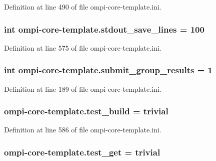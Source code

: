 Definition at line 490 of file ompi-\/core-\/template.\-ini.

\hypertarget{namespaceompi-core-template_a447e1523988469a8bff3078b579fdbbf}{
\subsubsection[{stdout\-\_\-save\-\_\-lines}]{\setlength{\rightskip}{0pt plus 5cm}int ompi-\/core-\/template.\-stdout\-\_\-save\-\_\-lines = 100}}\label{namespaceompi-core-template_a447e1523988469a8bff3078b579fdbbf}


Definition at line 575 of file ompi-\/core-\/template.\-ini.

\hypertarget{namespaceompi-core-template_ad901c84f6aa10668dc9e69ba586dfbf4}{
\subsubsection[{submit\-\_\-group\-\_\-results}]{\setlength{\rightskip}{0pt plus 5cm}int ompi-\/core-\/template.\-submit\-\_\-group\-\_\-results = 1}}\label{namespaceompi-core-template_ad901c84f6aa10668dc9e69ba586dfbf4}


Definition at line 189 of file ompi-\/core-\/template.\-ini.

\hypertarget{namespaceompi-core-template_a0cff68d81d871e9b4b78961025027345}{
\subsubsection[{test\-\_\-build}]{\setlength{\rightskip}{0pt plus 5cm}ompi-\/core-\/template.\-test\-\_\-build = trivial}}\label{namespaceompi-core-template_a0cff68d81d871e9b4b78961025027345}


Definition at line 586 of file ompi-\/core-\/template.\-ini.

\hypertarget{namespaceompi-core-template_a075a5d52fcb2adb80f97aecc076193cd}{
\subsubsection[{test\-\_\-get}]{\setlength{\rightskip}{0pt plus 5cm}ompi-\/core-\/template.\-test\-\_\-get = trivial}}\label{namespaceompi-core-template_a075a5d52fcb2adb80f97aecc076193cd}


